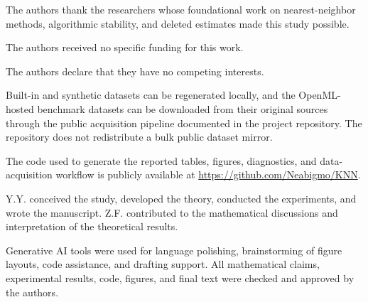 The authors thank the researchers whose foundational work on nearest-neighbor methods, algorithmic stability, and deleted estimates made this study possible.

The authors received no specific funding for this work.

The authors declare that they have no competing interests.

Built-in and synthetic datasets can be regenerated locally, and the OpenML-hosted benchmark datasets can be downloaded from their original sources through the public acquisition pipeline documented in the project repository. The repository does not redistribute a bulk public dataset mirror.

The code used to generate the reported tables, figures, diagnostics, and data-acquisition workflow is publicly available at \url{https://github.com/Neabigmo/KNN}.

Y.Y. conceived the study, developed the theory, conducted the experiments, and wrote the manuscript. Z.F. contributed to the mathematical discussions and interpretation of the theoretical results.

Generative AI tools were used for language polishing, brainstorming of figure layouts, code assistance, and drafting support. All mathematical claims, experimental results, code, figures, and final text were checked and approved by the authors.
